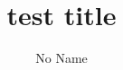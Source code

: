 \documentclass[conference]{style/IEEEtran}
\begin{document}
\title{test title}
\author{
  No Name
  
}

\maketitle







\end{document}
